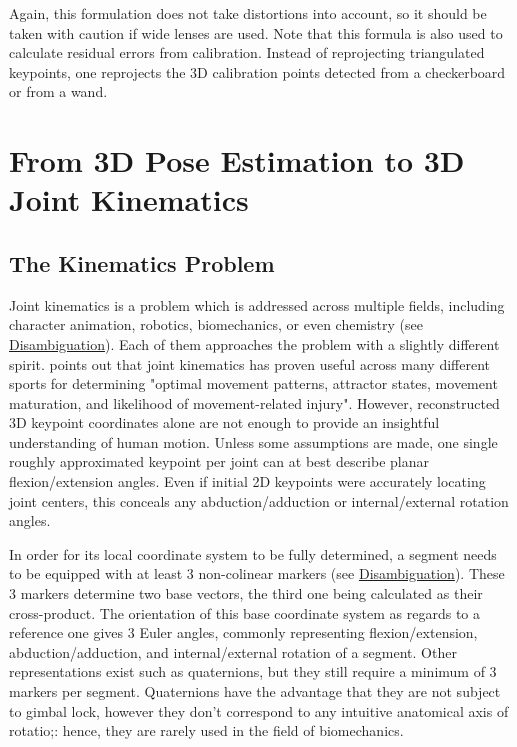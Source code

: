 Again, this formulation does not take distortions into account, so it should be taken with caution if wide lenses are used. Note that this formula is also used to calculate residual errors from calibration. Instead of reprojecting triangulated keypoints, one reprojects the 3D calibration points detected from a checkerboard or from a wand.



\newpage
\section{From 3D Pose Estimation to 3D Joint Kinematics}\label{sec:3D joint kin}

\subsection{The Kinematics Problem}

Joint kinematics is a problem which is addressed across multiple fields, including character animation, robotics, biomechanics, or even chemistry (see \hyperlink{Ann:gloss}{Disambiguation}). Each of them approaches the problem with a slightly different spirit. \cite{Robertson2013} points out that joint kinematics has proven useful across many different sports for determining "optimal movement patterns, attractor states, movement maturation, and likelihood of movement-related injury". However, reconstructed 3D keypoint coordinates alone are not enough to provide an insightful understanding of human motion. Unless some assumptions are made, one single roughly approximated keypoint per joint can at best describe planar flexion/extension angles. Even if initial 2D keypoints were accurately locating joint centers, this conceals any abduction/adduction or internal/external rotation angles. 

In order for its local coordinate system to be fully determined, a segment needs to be equipped with at least 3 non-colinear markers (see \hyperlink{Ann:gloss}{Disambiguation}). These 3 markers determine two base vectors, the third one being calculated as their cross-product. The orientation of this base coordinate system as regards to a reference one gives 3 Euler angles, commonly representing flexion/extension, abduction/adduction, and internal/external rotation of a segment. Other representations exist such as quaternions, but they still require a minimum of 3 markers per segment. Quaternions have the advantage that they are not subject to gimbal lock, however they don't correspond to any intuitive anatomical axis of rotatio;: hence, they are rarely used in the field of biomechanics. 

